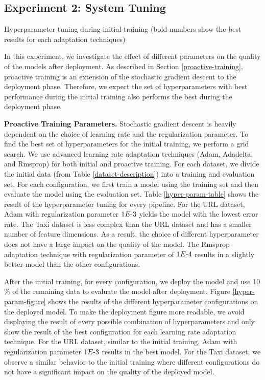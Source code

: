 \subsection{Experiment 2: System Tuning}
\begin{table*}[t]
\centering
\begin{adjustbox}{max width=\textwidth}

\end{adjustbox}
\caption{Hyperparameter tuning during initial training (bold numbers show the best results for each adaptation techniques)}
\label{hyper-param-table}
\end{table*}
In this experiment, we investigate the effect of different parameters on the quality of the models after deployment.
As described in Section \ref{proactive-training}, proactive training is an extension of the stochastic gradient descent to the deployment phase.
Therefore, we expect the set of hyperparameters with best performance during the initial training also performs the best during the deployment phase.

\textbf{Proactive Training Parameters. }
Stochastic gradient descent is heavily dependent on the choice of learning rate and the regularization parameter.
To find the best set of hyperparameters for the initial training, we perform a grid search.
We use advanced learning rate adaptation techniques (Adam, Adadelta, and Rmsprop) for both initial and proactive training.
For each dataset, we divide the initial data (from Table \ref{dataset-description}) into a training and evaluation set.
For each configuration, we first train a model using the training set and then evaluate the model using the evaluation set.
Table \ref{hyper-param-table} shows the result of the hyperparameter tuning for every pipeline.
For the URL dataset, Adam with regularization parameter $1E{\text -}3$ yields the model with the lowest error rate.
The Taxi dataset is less complex than the URL dataset and has a smaller number of feature dimensions.
As a result, the choice of different hyperparameter does not have a large impact on the quality of the model.
The Rmsprop adaptation technique with regularization parameter of $1E{\text -}4$ results in a slightly better model than the other configurations.

After the initial training, for every configuration, we deploy the model and use 10 \% of the remaining data to evaluate the model after deployment.
Figure \ref{hyper-param-figure} shows the results of the different hyperparameter configurations on the deployed model.
To make the deployment figure more readable, we avoid displaying the result of every possible combination of hyperparameters and only show the result of the best configuration for each learning rate adaptation technique.
For the URL dataset, similar to the initial training, Adam with regularization parameter $1E{\text -}3$ results in the best model.
For the Taxi dataset, we observe a similar behavior to the initial training where different configurations do not have a significant impact on the quality of the deployed model.

